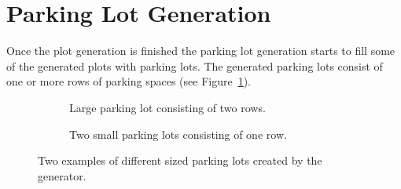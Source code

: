 \section{Parking Lot Generation}

Once the plot generation is finished the parking lot generation starts to fill some of the generated plots with parking lots.
The generated parking lots consist of one or more rows of parking spaces (see Figure~\ref{fig:results_parking_sizebased}).

\begin{figure}[H]
   \centering
   \begin{subfigure}[b]{0.38\textwidth}
     \caption{Large parking lot consisting of two rows.}
   \end{subfigure}
   \quad
   \begin{subfigure}[b]{0.52\textwidth}
     \caption{Two small parking lots consisting of one row.}
   \end{subfigure}
     \caption{Two examples of different sized parking lots created by the generator.}
   \label{fig:results_parking_sizebased}
 \end{figure}

